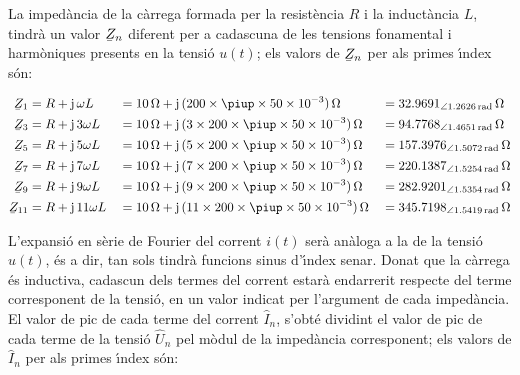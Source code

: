 \begin{exemple}
    La imped\`{a}ncia de la c\`{a}rrega formada per la resist\`{e}ncia $R$ i la
    induct\`{a}ncia $L$, tindr\`{a} un valor $\cmplx{Z}_n$ diferent per a
    cadascuna de les tensions fonamental i harm\`{o}niques presents en la
    tensi\'{o} $u(t)$; els valors de $\cmplx{Z}_n$ per als primes \'{\i}ndex s\'{o}n:

    \begin{alignat*}{3}
        \cmplx{Z}_1 &= R + \ju\, \omega L &&= \SI{10}{\ohm} + \ju\, (200\times \piup\times 50\times 10^{-3})\unit{\ohm} &&=
        \SIpr{32,9691}{1,2626}{\ohm}\\
        \cmplx{Z}_3 &= R + \ju\, 3 \omega L &&= \SI{10}{\ohm} + \ju\, (3\times 200\times \piup\times 50\times 10^{-3})\unit{\ohm} &&=
        \SIpr{94,7768}{1,4651}{\ohm}\\
        \cmplx{Z}_5 &= R + \ju\, 5 \omega L &&= \SI{10}{\ohm} + \ju\, (5\times 200\times \piup\times 50\times 10^{-3})\unit{\ohm} &&=
        \SIpr{157,3976}{1,5072}{\ohm}\\
        \cmplx{Z}_7 &= R + \ju\, 7 \omega L &&= \SI{10}{\ohm} + \ju\, (7\times 200\times \piup\times 50\times 10^{-3})\unit{\ohm} &&=
        \SIpr{220,1387}{1,5254}{\ohm}\\
        \cmplx{Z}_9 &= R + \ju\, 9 \omega L &&= \SI{10}{\ohm} + \ju\, (9\times 200\times \piup\times 50\times 10^{-3})\unit{\ohm} &&=
        \SIpr{282,9201}{1,5354}{\ohm}\\
        \cmplx{Z}_{11} &= R + \ju\, 11 \omega L &&= \SI{10}{\ohm} + \ju\, (11\times 200\times \piup\times 50\times 10^{-3})\unit{\ohm} &&=
        \SIpr{345,7198}{1,5419}{\ohm}
    \end{alignat*}

    L'expansi\'{o} en s\`{e}rie de Fourier del corrent $i(t)$ ser\`{a} an\`{a}loga a la
    de la tensi\'{o} $u(t)$, \'{e}s a dir, tan sols tindr\`{a} funcions sinus
    d'\'{\i}ndex senar. Donat que la c\`{a}rrega \'{e}s inductiva, cadascun dels
    termes del corrent estar\`{a} endarrerit respecte del terme corresponent
    de la tensi\'{o}, en un valor indicat per l'argument de cada imped\`{a}ncia.
    El valor de pic de cada terme del corrent $\hat{I}_n$, s'obt\'{e}
    dividint el valor de pic de cada terme de la tensi\'{o} $\hat{U}_n$ pel
    m\`{o}dul de la imped\`{a}ncia corresponent; els valors de $\hat{I}_n$ per
    als primes \'{\i}ndex s\'{o}n:


\end{exemple}
